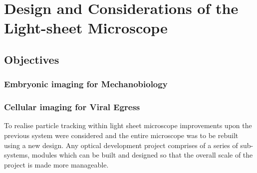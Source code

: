 

\ifpdf
    \graphicspath{{Chapters/design/Figs/Raster/}{Chapters/design/Figs/PDF/}{Chapters/design/Figs/}}
\else
    \graphicspath{{Chapters/design/Figs/Vector/}{Chapters/design/Figs/}}
\fi



\chapter{Design and Considerations of the Light-sheet Microscope}
\section{Objectives}


\subsection{Embryonic imaging for Mechanobiology}
\subsection{Cellular imaging for Viral Egress}

To realise particle tracking within light sheet microscope improvements upon the previous system were considered and the entire microscope was to be rebuilt using a new design.
Any optical development project comprises of a series of sub-systems, modules which can be built and designed so that the overall scale of the project is made more manageable.
%
%

